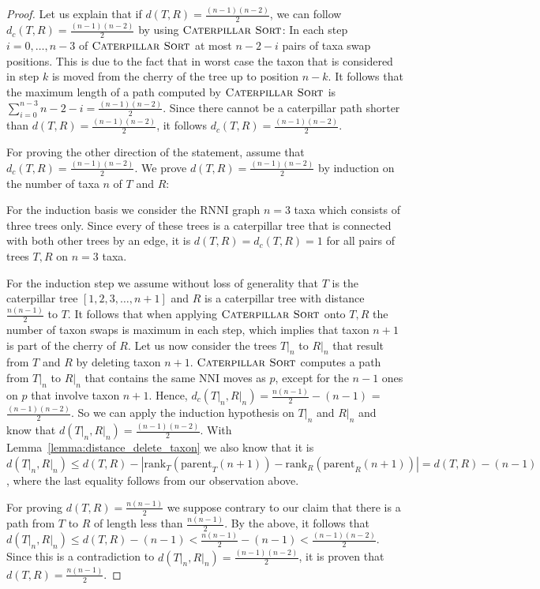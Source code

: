 \documentclass{amsart}
\newcommand{\parent}{\mathrm{parent}}
\newcommand{\rank}{\mathrm{rank}}
\newcommand{\nni}{\mathrm{NNI}}
\newcommand{\rnni}{\mathrm{RNNI}}
\newcommand{\csort}{\textsc{Caterpillar Sort}}
\begin{document}
\begin{proof}
Let us explain that if $d(T,R) = \frac{(n-1)(n-2)}{2}$, we can follow $d_c(T,R) = \frac{(n-1)(n-2)}{2}$ by using $\csort$:
In each step $i=0, \ldots, n-3$ of $\csort$ at most $n-2-i$ pairs of taxa swap positions.
This is due to the fact that in worst case the taxon that is considered in step $k$ is moved from the cherry of the tree up to position $n-k$.
It follows that the maximum length of a path computed by $\csort$ is $\sum\limits_{i=0}^{n-3} n-2-i = \frac{(n-1)(n-2)}{2}$.
Since there cannot be a caterpillar path shorter than $d(T,R) = \frac{(n-1)(n-2)}{2}$, it follows $d_c(T,R) = \frac{(n-1)(n-2)}{2}$.

For proving the other direction of the statement, assume that $d_c(T,R) = \frac{(n-1)(n-2)}{2}$.
We prove $d(T,R) = \frac{(n-1)(n-2)}{2}$ by induction on the number of taxa $n$ of $T$ and $R$:

For the induction basis we consider the $\rnni$ graph $n=3$ taxa which consists of three trees only.
Since every of these trees is a caterpillar tree that is connected with both other trees by an edge, it is $d(T,R) = d_c(T,R) = 1$ for all pairs of trees $T,R$ on $n=3$ taxa.

For the induction step we assume without loss of generality that $T$ is the caterpillar tree $[1,2,3,\ldots,n+1]$ and $R$ is a caterpillar tree with distance $\frac{n(n-1)}{2}$ to $T$.
It follows that when applying $\csort$ onto $T,R$ the number of taxon swaps is maximum in each step, which implies that taxon $n+1$ is part of the cherry of $R$.
Let us now consider the trees $T{\big|}_n$ to $R{\big|}_n$ that result from $T$ and $R$ by deleting taxon $n+1$.
$\csort$ computes a path from $T{\big|}_n$ to $R{\big|}_n$ that contains the same $\nni$ moves as $p$, except for the $n-1$ ones on $p$ that involve taxon $n+1$.
Hence, $d_c(T{\big|}_n, R{\big|}_n) = \frac{n(n-1)}{2} - (n-1)$ = $\frac{(n-1)(n-2)}{2}$.
So we can apply the induction hypothesis on $T{\big|}_n$ and $R{\big|}_n$ and know that $d(T{\big|}_n,R{\big|}_n) = \frac{(n-1)(n-2)}{2}$.
With Lemma~\ref{lemma:distance_delete_taxon} we also know that it is $d(T{\big|}_n, R{\big|}_n) \leq d(T,R) - |\rank_T(\parent_T(n+1)) - \rank_R(\parent_R(n+1))| = d(T,R) - (n-1)$, where the last equality follows from our observation above.

For proving $d(T,R) = \frac{n(n-1)}{2}$ we suppose contrary to our claim that there is a path from $T$ to $R$ of length less than $\frac{n(n-1)}{2}$.
By the above, it follows that $d(T{\big|}_n, R{\big|}_n) \leq d(T,R) - (n-1) < \frac{n(n-1)}{2} - (n-1) < \frac{(n-1)(n-2)}{2}$.
Since this is a contradiction to $d(T{\big|}_n, R{\big|}_n) = \frac{(n-1)(n-2)}{2}$, it is proven that $d(T,R) = \frac{n(n-1)}{2} $.
\end{proof}
\end{document}
